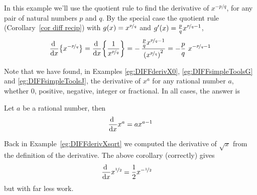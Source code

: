 \begin{eg}\label{eg:DIFFsimpleToolsJ}
In this example we'll use the quotient rule to find the derivative of
$x^{-p/q}$, for any pair of natural numbers $p$ and $q$. By the special case
the quotient rule (Corollary~\ref{cor diff recip}) with
$g(x)=x^{\nicefrac{p}{q}}$ and $g'(x)=\frac{p}{q}x^{\nicefrac{p}{q}-1}$,
\begin{align*}
\diff{}{x}\big\{x^{-\nicefrac{p}{q}}\big\}
=\diff{}{x}\bigg\{\frac{1}{x^{\nicefrac{p}{q}}}\bigg\}
=-\,\frac{\frac{p}{q}x^{\nicefrac{p}{q}-1}}{{(x^{\nicefrac{p}{q}})}^2}
=-\frac{p}{q}\ x^{-\nicefrac{p}{q}-1}
\end{align*}
\end{eg}

Note that we have found, in Examples \ref{eg:DIFFderivX0},
\ref{eg:DIFFsimpleToolsG} and \ref{eg:DIFFsimpleToolsJ},
the derivative of $x^a$ for any rational number $a$, whether
0, positive, negative, integer or fractional. In all cases, the answer
is
\begin{cor}[Derivative of $x^a$]\label{cor:DIFFxtoa}
  Let $a$ be a rational number, then
\begin{equation}
\diff{}{x} x^a = a x^{a-1}
\end{equation}
\end{cor}

Back in Example~\ref{eg:DIFFderivXsqrt} we computed the derivative of $\sqrt{x}$ from the
definition of the derivative. The above corollary (correctly) gives
\begin{align*}
  \diff{}{x} x^{\nicefrac{1}{2}} &= \frac{1}{2} x^{-\nicefrac{1}{2}}
\end{align*}
but with far less work.


